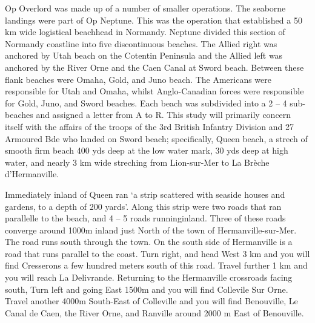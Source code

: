 \documentclass[noraggedright]{turabian-researchpaper}
\begin{document}

Op Overlord was made up of a number of smaller operations.  The seaborne
landings were part of Op Neptune.  This was the operation that established a
50 km wide logistical beachhead in Normandy.  Neptune divided this section of
Normandy coastline into five discontinuous beaches.  The Allied right was 
anchored by Utah beach on the Cotentin Peninsula and the Allied left was 
anchored by the River Orne and the Caen Canal at Sword beach.  Between
these flank beaches were Omaha, Gold, and Juno beach.  The Americans were 
responsible for Utah and Omaha, whilst Anglo-Canadian forces were responsible
for Gold, Juno, and Sword beaches.  Each beach was subdivided into a 2 -- 4
sub-beaches and assigned a letter from A to R.  This study will primarily 
concern itself with the affairs of the troops of the 3rd British Infantry 
Division and 27 Armoured Bde who landed on Sword beach; specifically, Queen 
beach, a strech of smooth firm beach 400 yds deep at the low water mark,
30 yds deep at high water, and nearly 3 km wide streching from Lion-sur-Mer 
to La Brèche d'Hermanville.%

Immediately inland of Queen ran `a strip scattered with seaside houses and
gardens, to a depth of 200 yards'.%
Along this strip were two roads that ran parallelle to the beach, and 4 -- 5
roads runninginland.  Three of these roads converge around 1000m inland just
North of the town of Hermanville-sur-Mer.  The road runs south through the 
town.  On the south side of Hermanville is a road that runs parallel to the
coast.  Turn right, and head West 3 km and you will find Cresserons a few
hundred meters south of this road.  Travel further 1 km and you will
reach La Delivrande.  Returning to the Hermanville crossroads facing south, 
Turn left and going East 1500m and you will find Collevile Sur Orne. Travel 
another 4000m South-East of Colleville and you will find Benouville, 
Le Canal de Caen, the River Orne, and Ranville around 2000 m East of 
Benouville.  
\end{document}
